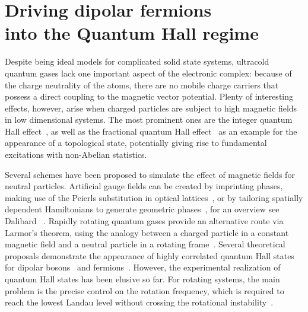 \chapter[Driving dipolar fermions into the Quantum Hall regime]{Driving dipolar fermions\texorpdfstring{\\}{ }into the Quantum Hall regime}
\label{dipolar_fermions}

Despite being ideal models for complicated solid state systems, ultracold quantum gases lack one important aspect of the electronic complex: because of the charge neutrality of the atoms, there are no mobile charge carriers that possess a direct coupling to the magnetic vector potential. Plenty of interesting effects, however, arise when charged particles are subject to high magnetic fields in low dimensional systems. The most prominent ones are the integer quantum Hall effect~\cite{Klitzing1980}, as well as the fractional quantum Hall effect~\cite{Laughlin1983} as an example for the appearance of a topological state, potentially giving rise to fundamental excitations with non-Abelian statistics.

Several schemes have been proposed to simulate the effect of magnetic fields for neutral particles. Artificial gauge fields can be created by imprinting phases, making use of the Peierls substitution in optical lattices~\cite{Aidelsburger2011,Jimenez-Garcia2012,Struck2012}, or by tailoring spatially dependent Hamiltonians to generate geometric phases~\cite{Lin2009}, for an overview see Dalibard \etal~\cite{Dalibard2011}. Rapidly rotating quantum gases provide an alternative route via Larmor's theorem, using the analogy between a charged particle in a constant magnetic field and a neutral particle in a rotating frame~\cite{Cooper2008,Fetter2009}. Several theoretical proposals demonstrate the appearance of highly correlated quantum Hall states for dipolar bosons~\cite{Cooper2005} and fermions~\cite{Baranov2005,Osterloh2007}. However, the experimental realization of quantum Hall states has been elusive so far. For rotating systems, the main problem is the precise control on the rotation frequency, which is required to reach the lowest Landau level without crossing the rotational instability~\cite{Schweikhard2004}.

